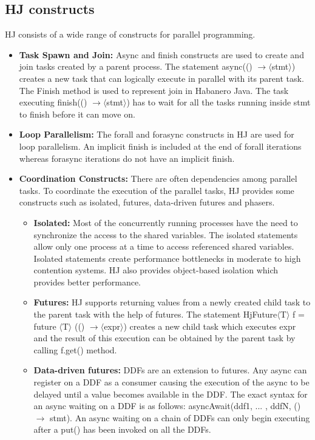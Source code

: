 \subsection{\textbf{HJ constructs}}
HJ consists of a wide range of constructs for parallel programming.
\begin{itemize}
\item \textbf{Task Spawn and Join:} Async and finish constructs are used to create and join tasks created by a parent process. The statement async(() $ \rightarrow \langle$stmt$\rangle$) creates a new task that can logically execute in parallel with its parent task. The Finish method is used to represent join in Habanero Java. The task executing finish(() $ \rightarrow \langle$stmt$\rangle$) has to wait for all the tasks running inside stmt to finish before it can move on.
\item \textbf{Loop Parallelism:} The forall and forasync constructs in HJ are used for loop parallelism. An implicit finish is included at the end of forall iterations whereas forasync iterations do not have an implicit finish. 
\item \textbf{Coordination Constructs:} There are often dependencies among parallel tasks. To coordinate the execution of the parallel tasks, HJ provides some constructs such as isolated, futures, data-driven futures and phasers.
\begin{itemize}
\item \textbf{Isolated:} Most of the concurrently running processes have the need to synchronize the access to the shared variables. The isolated statements allow only one process at a time to access referenced shared variables. Isolated statements create performance bottlenecks in moderate to high contention systems. HJ also provides object-based isolation which provides better performance.
\item \textbf{Futures:} HJ supports returning values from a newly created child task to the parent task with the help of futures. The statement HjFuture$\langle$T$\rangle$ f = future $\langle$T$\rangle$ (() $ \rightarrow \langle$expr$\rangle$) creates a new child task which executes expr and the result of this execution can be obtained by the parent task by calling f.get() method.
\item \textbf{Data-driven futures:} DDFs are an extension to futures. Any async can register on a DDF as a consumer causing the execution of the async to be delayed until a value becomes available in the DDF. The exact syntax for an async waiting on a DDF is as follows: asyncAwait(ddf1, ... , ddfN, () $\rightarrow$ stmt). An async waiting on a chain of DDFs can only begin executing after a put() has been invoked on all the DDFs.

\end{itemize}
\end{itemize}
